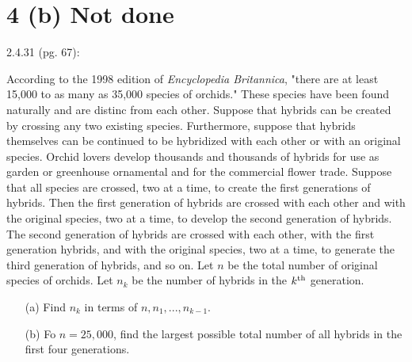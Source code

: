 \documentclass{article}
\begin{document}
\section*{4 (b) Not done}
\begin{ques}\label{q4}
    2.4.31 (pg. 67):

    According to the 1998 edition of \emph{Encyclopedia Britannica}, "there are at least 15,000 to as many as 35,000 species of orchids." These species have been found naturally and are distinc from each other. Suppose that hybrids can be created by crossing any two existing species. Furthermore, suppose that hybrids themselves can be continued to be hybridized with each other or with an original species. Orchid lovers develop thousands and thousands of hybrids for use as garden or greenhouse ornamental and for the commercial flower trade. Suppose that all species are crossed, two at a time, to create the first generations of hybrids. Then the first generation of hybrids are crossed with each other and with the original species, two at a time, to develop the second generation of hybrids. The second generation of hybrids are crossed with each other, with the first generation hybrids, and with the original species, two at a time, to generate the third generation of hybrids, and so on. Let $n$ be the total number of original species of orchids. Let $n_k$ be the number of hybrids in the $k^\textmd{th}$ generation.
    \begin{itemize}
        \item[(a)] Find $n_k$ in terms of $n,n_1,...,n_{k-1}$.
        \item[(b)] Fo $n=25,000$, find the largest possible total number of all hybrids in the first four generations. 
    \end{itemize}
\end{ques}
\end{document}
